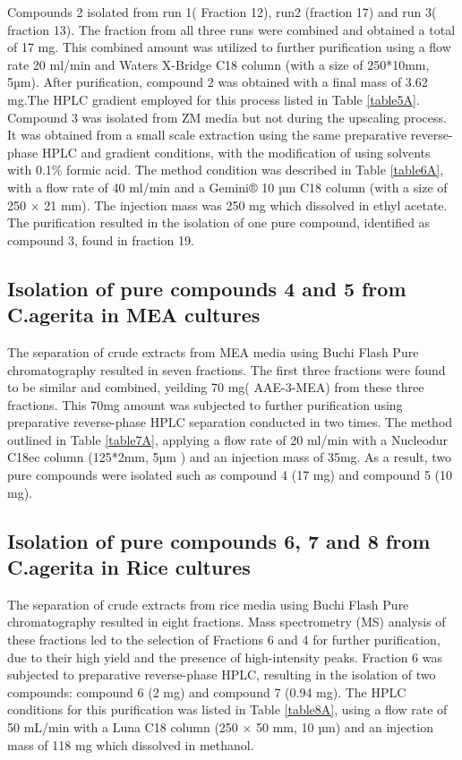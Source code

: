 Compounds 2 isolated from run 1( Fraction 12), run2 (fraction 17) and run 3( fraction 13). The fraction from all three runs  were combined and obtained a total of 17 mg. This combined amount was utilized to further purification using a flow rate 20 ml/min and Waters X-Bridge C18 column (with a size of  250*10mm, 5µm). After purification, compound  2 was obtained with a final mass of  3.62 mg.The HPLC  gradient employed for this process  listed in Table \ref{table5A}.\\

Compound 3 was isolated from ZM media but not during the upscaling process. It was obtained from a small scale extraction using the same preparative reverse-phase HPLC and gradient conditions, with the modification of using solvents with 0.1\% formic acid. The method condition was described in Table \ref{table6A}, with a flow rate of 40 ml/min and a Gemini® 10 µm C18 column (with a size of 250 × 21 mm). The  injection mass was 250 mg which dissolved in ethyl acetate. The purification resulted in the isolation of one pure compound, identified as compound 3, found in fraction 19.


\subsection{Isolation of pure compounds 4 and 5  from C.agerita in MEA cultures}
The separation of crude extracts from MEA media using Buchi Flash Pure chromatography resulted in  seven fractions. The first three fractions were found to be similar and combined, yeilding 70 mg( AAE-3-MEA) from these three fractions. This 70mg amount was subjected to further purification using preparative reverse-phase HPLC separation conducted in two times. The method outlined in Table \ref{table7A}, applying a flow rate of 20 ml/min with a Nucleodur C18ec column (125*2mm, 5µm ) and an injection mass of 35mg. As a result, two pure compounds were isolated such as compound 4 (17 mg)  and compound 5 (10 mg).


\subsection{Isolation of pure compounds 6, 7 and 8 from C.agerita in Rice cultures}
The separation of crude extracts from rice media using Buchi Flash Pure chromatography resulted in eight fractions. Mass spectrometry (MS) analysis of these fractions led to the selection of Fractions 6 and 4 for further purification, due to their high yield and the presence of high-intensity peaks. Fraction 6 was subjected to preparative reverse-phase HPLC, resulting in the isolation of two compounds: compound 6 (2 mg) and compound 7 (0.94 mg). The HPLC conditions for this purification was listed in Table \ref{table8A}, using a flow rate of 50 mL/min with a Luna C18 column (250 × 50 mm, 10 µm) and an injection mass of 118 mg which dissolved in methanol.\\

